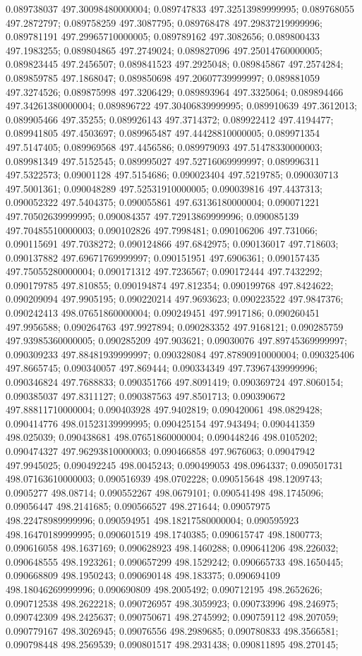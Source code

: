 0.089738037 497.30098480000004; 0.089747833 497.32513989999995; 0.089768055 497.2872797; 0.089758259 497.3087795; 0.089768478 497.29837219999996; 0.089781191 497.29965710000005; 0.089789162 497.3082656; 0.089800433 497.1983255; 0.089804865 497.2749024; 0.089827096 497.25014760000005; 0.089823445 497.2456507; 0.089841523 497.2925048; 0.089845867 497.2574284; 0.089859785 497.1868047; 0.089850698 497.20607739999997; 0.089881059 497.3274526; 0.089875998 497.3206429; 0.089893964 497.3325064; 0.089894466 497.34261380000004; 0.089896722 497.30406839999995; 0.089910639 497.3612013; 0.089905466 497.35255; 0.089926143 497.3714372; 0.089922412 497.4194477; 0.089941805 497.4503697; 0.089965487 497.44428810000005; 0.089971354 497.5147405; 0.089969568 497.4456586; 0.089979093 497.51478330000003; 0.089981349 497.5152545; 0.089995027 497.52716069999997; 0.089996311 497.5322573; 0.09001128 497.5154686; 0.090023404 497.5219785; 0.090030713 497.5001361; 0.090048289 497.52531910000005; 0.090039816 497.4437313; 0.090052322 497.5404375; 0.090055861 497.63136180000004; 0.090071221 497.70502639999995; 0.090084357 497.72913869999996; 0.090085139 497.70485510000003; 0.090102826 497.7998481; 0.090106206 497.731066; 0.090115691 497.7038272; 0.090124866 497.6842975; 0.090136017 497.718603; 0.090137882 497.69671769999997; 0.090151951 497.6906361; 0.090157435 497.75055280000004; 0.090171312 497.7236567; 0.090172444 497.7432292; 0.090179785 497.810855; 0.090194874 497.812354; 0.090199768 497.8424622; 0.090209094 497.9905195; 0.090220214 497.9693623; 0.090223522 497.9847376; 0.090242413 498.07651860000004; 0.090249451 497.9917186; 0.090260451 497.9956588; 0.090264763 497.9927894; 0.090283352 497.9168121; 0.090285759 497.93985360000005; 0.090285209 497.903621; 0.09030076 497.89745369999997; 0.090309233 497.88481939999997; 0.090328084 497.87890910000004; 0.090325406 497.8665745; 0.090340057 497.869444; 0.090334349 497.73967439999996; 0.090346824 497.7688833; 0.090351766 497.8091419; 0.090369724 497.8060154; 0.090385037 497.8311127; 0.090387563 497.8501713; 0.090390672 497.88811710000004; 0.090403928 497.9402819; 0.090420061 498.0829428; 0.090414776 498.01523139999995; 0.090425154 497.943494; 0.090441359 498.025039; 0.090438681 498.07651860000004; 0.090448246 498.0105202; 0.090474327 497.96293810000003; 0.090466858 497.9676063; 0.09047942 497.9945025; 0.090492245 498.0045243; 0.090499053 498.0964337; 0.090501731 498.07163610000003; 0.090516939 498.0702228; 0.090515648 498.1209743; 0.0905277 498.08714; 0.090552267 498.0679101; 0.090541498 498.1745096; 0.09056447 498.2141685; 0.090566527 498.271644; 0.09057975 498.22478989999996; 0.090594951 498.18217580000004; 0.090595923 498.16470189999995; 0.090601519 498.1740385; 0.090615747 498.1800773; 0.090616058 498.1637169; 0.090628923 498.1460288; 0.090641206 498.226032; 0.090648555 498.1923261; 0.090657299 498.1529242; 0.090665733 498.1650445; 0.090668809 498.1950243; 0.090690148 498.183375; 0.090694109 498.18046269999996; 0.090690809 498.2005492; 0.090712195 498.2652626; 0.090712538 498.2622218; 0.090726957 498.3059923; 0.090733996 498.246975; 0.090742309 498.2425637; 0.090750671 498.2745992; 0.090759112 498.207059; 0.090779167 498.3026945; 0.09076556 498.2989685; 0.090780833 498.3566581; 0.090798448 498.2569539; 0.090801517 498.2931438; 0.090811895 498.270145; 